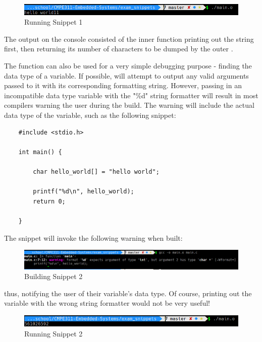 \documentclass[paper=usletter, fontsize=12pt]{article}
\begin{document}
    \begin{figure}[ht]
        \begin{center}
            \includegraphics[width=1\textwidth]{run1.png}
            \caption{Running Snippet 1} \label{fig:run1}
        \end{center}
    \end{figure}

    The output on the console consisted of the inner  function printing out the string first, then returning its number of characters to be dumped by the outer .

    The function can also be used for a very simple debugging purpose - finding the data type of a variable. If possible,  will attempt to output any valid arguments passed to it with its corresponding formatting string. However, passing in an incompatible data type variable with the "\%d" string formatter will result in most compilers warning the user during the build. The warning will include the actual data type of the variable, such as the following snippet:

\begin{lstlisting}
    #include <stdio.h>

    int main() {

        char hello_world[] = "hello world";

        printf("%d\n", hello_world);
        return 0;

    }
\end{lstlisting}

    The snippet will invoke the following warning when built:

    \begin{figure}[ht]
        \begin{center}
            \includegraphics[width=1\textwidth]{build2.png}
            \caption{Building Snippet 2} \label{fig:build2}
        \end{center}
    \end{figure}

    thus, notifying the user of their variable's data type. Of course, printing out the variable with the wrong string formatter would not be very useful!

    \begin{figure}[ht]
        \begin{center}
            \includegraphics[width=1\textwidth]{run2.png}
            \caption{Running Snippet 2} \label{fig:run2}
        \end{center}
    \end{figure}
\end{document}
